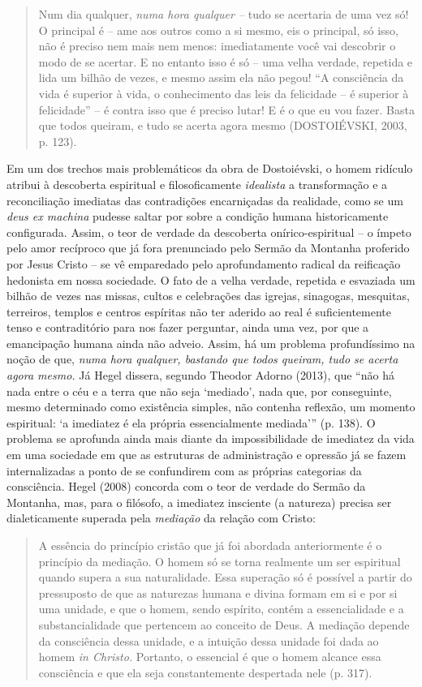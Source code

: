 \begin{quote}
Num dia qualquer, \emph{numa hora qualquer --} tudo se acertaria de uma
vez só! O principal é -- ame aos outros como a si mesmo, eis o
principal, só isso, não é preciso nem mais nem menos: imediatamente você
vai descobrir o modo de se acertar. E no entanto isso é só -- uma velha
verdade, repetida e lida um bilhão de vezes, e mesmo assim ela não
pegou! ``A consciência da vida é superior à vida, o conhecimento das
leis da felicidade -- é superior à felicidade'' -- é contra isso que é
preciso lutar! E é o que eu vou fazer. Basta que todos queiram, e tudo
se acerta agora mesmo (DOSTOIÉVSKI, 2003, p. 123).
\end{quote}

Em um dos trechos mais problemáticos da obra de Dostoiévski, o homem
ridículo atribui à descoberta espiritual e filosoficamente
\emph{idealista} a transformação e a reconciliação imediatas das
contradições encarniçadas da realidade, como se um \emph{deus ex
machina} pudesse saltar por sobre a condição humana historicamente
configurada. Assim, o teor de verdade da descoberta onírico-espiritual
-- o ímpeto pelo amor recíproco que já fora prenunciado pelo Sermão da
Montanha proferido por Jesus Cristo -- se vê emparedado pelo
aprofundamento radical da reificação hedonista em nossa sociedade. O
fato de a velha verdade, repetida e esvaziada um bilhão de vezes nas
missas, cultos e celebrações das igrejas, sinagogas, mesquitas,
terreiros, templos e centros espíritas não ter aderido ao real é
suficientemente tenso e contraditório para nos fazer perguntar, ainda
uma vez, por que a emancipação humana ainda não adveio. Assim, há um
problema profundíssimo na noção de que, \emph{numa hora qualquer,
bastando que todos queiram, tudo se acerta agora mesmo.} Já Hegel
dissera, segundo Theodor Adorno (2013), que ``não há nada entre o céu e
a terra que não seja `mediado', nada que, por conseguinte, mesmo
determinado como existência simples, não contenha reflexão, um momento
espiritual: `a imediatez é ela própria essencialmente mediada''' (p.
138). O problema se aprofunda ainda mais diante da impossibilidade de
imediatez da vida em uma sociedade em que as estruturas de administração
e opressão já se fazem internalizadas a ponto de se confundirem com as
próprias categorias da consciência. Hegel (2008) concorda com o teor de
verdade do Sermão da Montanha, mas, para o filósofo, a imediatez
insciente (a natureza) precisa ser dialeticamente superada pela
\emph{mediação} da relação com Cristo:

\begin{quote}
A essência do princípio cristão que já foi abordada anteriormente é o
princípio da mediação. O homem só se torna realmente um ser espiritual
quando supera a sua naturalidade. Essa superação só é possível a partir
do pressuposto de que as naturezas humana e divina formam em si e por si
uma unidade, e que o homem, sendo espírito, contém a essencialidade e a
substancialidade que pertencem ao conceito de Deus. A mediação depende
da consciência dessa unidade, e a intuição dessa unidade foi dada ao
homem \emph{in Christo.} Portanto, o essencial é que o homem alcance
essa consciência e que ela seja constantemente despertada nele (p. 317).
\end{quote}

